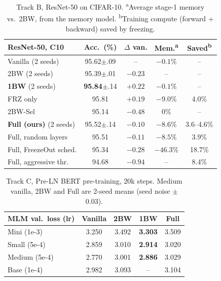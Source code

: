 \documentclass[10pt,twocolumn]{article}
\begin{document}
\begin{table}[t]
  \centering\footnotesize
  \setlength{\tabcolsep}{3pt}
  \begin{tabular}{lcccc}
    \toprule
    ResNet-50, C10 & Acc.\ (\%) & $\Delta$ van. & Mem.\textsuperscript{a} & Saved\textsuperscript{b} \\
    \midrule
    Vanilla (2 seeds) & 95.62$\pm$.09 & -- & $-0.1\%$ & -- \\
    2BW (2 seeds) & 95.39$\pm$.01 & $-0.23$ & -- & -- \\
    \textbf{1BW} (2 seeds) & \textbf{95.84}$\pm$.14 & $+0.22$ & $-0.1\%$ & -- \\
    FRZ only & 95.81 & $+0.19$ & $-9.0\%$ & 4.0\% \\
    2BW-Sel & 95.14 & $-0.48$ & 0\% & -- \\
    \textbf{Full (ours)} (2 seeds) & 95.52$\pm$.14 & $-0.10$ & $-8.6\%$ & 3.6--4.6\% \\
    Full, random layers & 95.51 & $-0.11$ & $-8.5\%$ & 3.9\% \\
    Full, FreezeOut sched. & 95.34 & $-0.28$ & $-46.3\%$ & 18.7\% \\
    Full, aggressive thr. & 94.68 & $-0.94$ & -- & 8.4\% \\
    \bottomrule
  \end{tabular}
  \caption{Track B, ResNet-50 on CIFAR-10. \textsuperscript{a}Average stage-1 memory vs.\
    2BW, from the memory model. \textsuperscript{b}Training compute (forward + backward) saved
    by freezing.}
  \label{tab:b}
\end{table}

\begin{table}[t]
  \centering\small
  \setlength{\tabcolsep}{4.5pt}
  \begin{tabular}{lcccc}
    \toprule
    MLM val.\ loss (lr) & Vanilla & 2BW & \textbf{1BW} & Full \\
    \midrule
    Mini (1e-3) & 3.250 & 3.492 & \textbf{3.303} & 3.509 \\
    Small (5e-4) & 2.859 & 3.010 & \textbf{2.914} & 3.020 \\
    Medium (5e-4) & 2.770 & 3.001 & \textbf{2.886} & 3.029 \\
    Base (1e-4) & 2.982 & 3.093 & -- & 3.104 \\
    \bottomrule
  \end{tabular}
  \caption{Track C, Pre-LN BERT pre-training, 20k steps. Medium vanilla, 2BW and Full are
    2-seed means (seed noise $\pm$0.03).}
  \label{tab:c}
\end{table}
\end{document}
